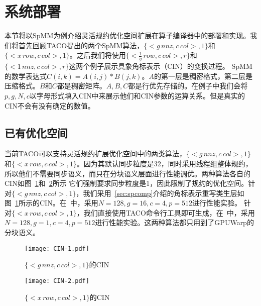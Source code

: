 \section{系统部署}
本节将以SpMM为例介绍灵活规约优化空间扩展在算子编译器中的部署和实现。我们将首先回顾TACO提出的两个SpMM算法，$\{<g\,nnz, c\,col>,1\}$和$\{<x\,row,c\,col >,1\}$。之后我们将使用$\{<\frac{1}{g}\,row, c\,col>,r\}$和$\{<1\,nnz , c\,col>,r\}$这两个例子展示具象角标表示（CIN）的变换过程。
SpMM的数学表达式$C(i,k) = A(i,j) * B(j,k)$。$A$的第一层是稠密格式，第二层是压缩格式。$B$和$C$都是稠密矩阵。$A,B,C$都是行优先存储的。在例子中我们会将$p,g,N,c$以字母形式填入CIN中来展示他们和CIN参数的运算关系。但是真实的CIN不会有没有确定的数值。
\subsection{已有优化空间}
当前TACO可以支持灵活规约扩展优化空间中的两类算法，$\{<g\,nnz, c\,col>,1\}$和$\{<x\,row,c\,col >,1\}$。因为其默认同步粒度是32，同时采用线程组整体规约，所以他们不需要同步语义，而只在分块语义层面进行性能调优。两种算法各自的CIN如图~\ref{fig:CIN-1}和~\ref{fig:CIN-2}所示
它们强制要求同步粒度是1，因此限制了规约的优化空间。针对$\{<g\,nnz, c\,col>,1\}$，我们采用~\ref{sec:spcomp}介绍的角标表示重写类生层如图~\ref{fig:CIN-1}所示的CIN。在~\cite{senanayake:2020:scheduling}中，采用$N=128,g=16,c=4,p=512$进行性能实验。
针对$\{<x\,row,c\,col >,1\}$，我们直接使用TACO命令行工具即可生成，在~\cite{senanayake:2020:scheduling}中，采用$N=128,g=1,c=4,p=512$进行性能实验。这两种算法都只用到了GPUWarp的分块语义。
\begin{figure}[h]%
  \centering
  \texttt{[image: CIN-1.pdf]}
  \caption{$\{<g\,nnz, c\,col>,1\}$的CIN}\label{fig:CIN-1}
\end{figure}
\begin{figure}[h]%
  \centering
  \texttt{[image: CIN-2.pdf]}
  \caption{$\{<x\,row,c\,col >,1\}$的CIN}\label{fig:CIN-2}
\end{figure}
